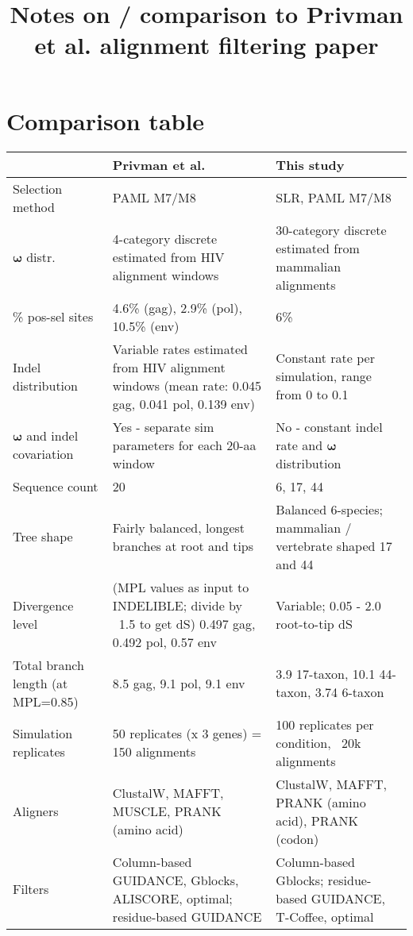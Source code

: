 \documentclass{article}
\newcommand{\omg}{\bm{\omega}\xspace}
\begin{document}
\title{Notes on / comparison to Privman et al. alignment filtering paper}
\maketitle

\section{Comparison table}

\begin{table}[h]
\footnotesize \raggedright \tabcolsep 5pt
\begin{tabular}{ m{3cm} m{7cm} m{7cm} }
 & Privman et al.
 & This study
\\
\hline
  Selection method & PAML M7/M8 & SLR, PAML M7/M8\\
  $\omg{}$ distr.
    & 4-category discrete estimated from HIV alignment windows
    & 30-category discrete estimated from mammalian alignments\\
  \% pos-sel sites
    & 4.6\% (gag), 2.9\% (pol), 10.5\% (env)
    & 6\%\\
  Indel distribution
    & Variable rates estimated from HIV alignment windows (mean rate: 0.045 gag, 0.041 pol, 0.139 env)
    & Constant rate per simulation, range from 0 to 0.1\\
  $\omg$ and indel covariation
    & Yes - separate sim parameters for each 20-aa window
    & No - constant indel rate and $\omg$ distribution\\
  Sequence count
    & 20
    & 6, 17, 44\\
  Tree shape
    & Fairly balanced, longest branches at root and tips
    & Balanced 6-species; mammalian / vertebrate shaped 17 and 44\\
  Divergence level
    & (MPL values as input to INDELIBLE; divide by ~1.5 to get dS) 0.497 gag, 0.492 pol, 0.57 env
    & Variable; 0.05 - 2.0 root-to-tip dS\\
  Total branch length (at MPL=0.85)
    & 8.5 gag, 9.1 pol, 9.1 env
    & 3.9 17-taxon, 10.1 44-taxon, 3.74 6-taxon\\
  Simulation replicates
    & 50 replicates (x 3 genes) = 150 alignments
    & 100 replicates per condition, ~20k alignments\\
  Aligners
    & ClustalW, MAFFT, MUSCLE, PRANK (amino acid)
    & ClustalW, MAFFT, PRANK (amino acid), PRANK (codon)\\
  Filters
    & Column-based GUIDANCE, Gblocks, ALISCORE, optimal; residue-based GUIDANCE
    & Column-based Gblocks; residue-based GUIDANCE, T-Coffee, optimal\\
\end{tabular}
\end{table}
\end{document}

